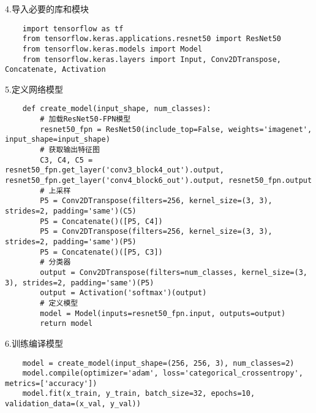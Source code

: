 4.导入必要的库和模块
\begin{lstlisting}
    import tensorflow as tf
    from tensorflow.keras.applications.resnet50 import ResNet50
    from tensorflow.keras.models import Model
    from tensorflow.keras.layers import Input, Conv2DTranspose, Concatenate, Activation 
\end{lstlisting}

5.定义网络模型
\begin{lstlisting}
    def create_model(input_shape, num_classes):
        # 加载ResNet50-FPN模型
        resnet50_fpn = ResNet50(include_top=False, weights='imagenet', input_shape=input_shape)
        # 获取输出特征图
        C3, C4, C5 = resnet50_fpn.get_layer('conv3_block4_out').output, resnet50_fpn.get_layer('conv4_block6_out').output, resnet50_fpn.output
        # 上采样
        P5 = Conv2DTranspose(filters=256, kernel_size=(3, 3), strides=2, padding='same')(C5)
        P5 = Concatenate()([P5, C4])
        P5 = Conv2DTranspose(filters=256, kernel_size=(3, 3), strides=2, padding='same')(P5)
        P5 = Concatenate()([P5, C3])
        # 分类器
        output = Conv2DTranspose(filters=num_classes, kernel_size=(3, 3), strides=2, padding='same')(P5)
        output = Activation('softmax')(output)
        # 定义模型
        model = Model(inputs=resnet50_fpn.input, outputs=output)
        return model
\end{lstlisting}

6.训练编译模型
\begin{lstlisting}
    model = create_model(input_shape=(256, 256, 3), num_classes=2)
    model.compile(optimizer='adam', loss='categorical_crossentropy', metrics=['accuracy'])
    model.fit(x_train, y_train, batch_size=32, epochs=10, validation_data=(x_val, y_val))
\end{lstlisting}

